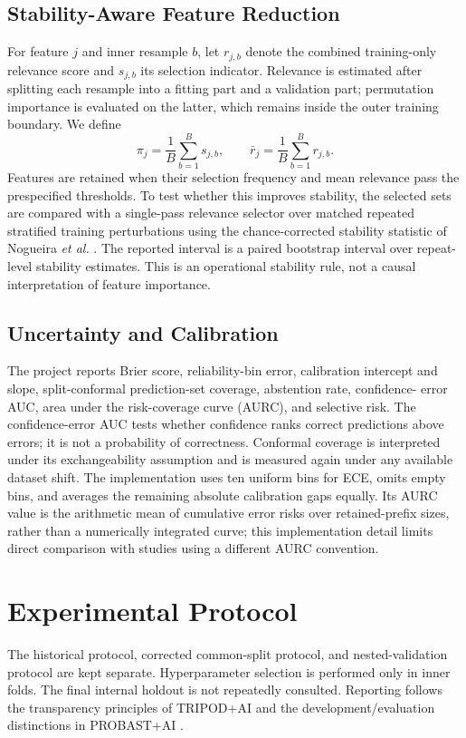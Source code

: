 \documentclass[12pt]{article}
\begin{document}
\subsection{Stability-Aware Feature Reduction}
For feature $j$ and inner resample $b$, let $r_{j,b}$ denote the combined
training-only relevance score and $s_{j,b}$ its selection indicator. Relevance
is estimated after splitting each resample into a fitting part and a validation
part; permutation importance is evaluated on the latter, which remains inside
the outer training boundary. We define
\begin{equation}
\pi_j = \frac{1}{B}\sum_{b=1}^{B}s_{j,b}, \qquad
\bar r_j = \frac{1}{B}\sum_{b=1}^{B}r_{j,b}.
\end{equation}
Features are retained when their selection frequency and mean relevance pass
the prespecified thresholds. To test whether this improves stability, the
selected sets are compared with a single-pass relevance selector over matched
repeated stratified training perturbations using the chance-corrected stability
statistic of Nogueira \emph{et al.} \cite{nogueira2018stability}. The reported
interval is a paired bootstrap interval over repeat-level stability estimates.
This is an operational stability rule, not a causal interpretation of feature
importance.

\subsection{Uncertainty and Calibration}
The project reports Brier score, reliability-bin error, calibration intercept
and slope, split-conformal prediction-set coverage, abstention rate, confidence-
error AUC, area under the risk-coverage curve (AURC), and selective risk. The
confidence-error AUC tests whether confidence ranks correct predictions above
errors; it is not a probability of correctness. Conformal coverage is
interpreted under its exchangeability assumption \cite{angelopoulos2023conformal}
and is measured again under any available dataset shift.
The implementation uses ten uniform bins for ECE, omits empty bins, and
averages the remaining absolute calibration gaps equally. Its AURC value is
the arithmetic mean of cumulative error risks over retained-prefix sizes,
rather than a numerically integrated curve; this implementation detail limits
direct comparison with studies using a different AURC convention.

\section{Experimental Protocol}
The historical protocol, corrected common-split protocol, and nested-validation
protocol are kept separate. Hyperparameter selection is performed only in inner
folds. The final internal holdout is not repeatedly consulted. Reporting follows
the transparency principles of TRIPOD+AI \cite{collins2024tripodai} and the
development/evaluation distinctions in PROBAST+AI \cite{moons2025probastai}.
\end{document}

